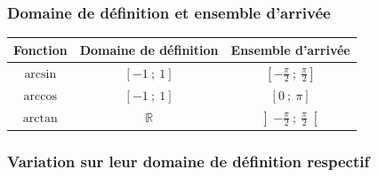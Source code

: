 \documentclass[a4paper]{article}
\begin{document}
			\vspace*{-0.25cm}

			\subsubsection*{Domaine de définition et ensemble d'arrivée}

				\begin{center}
					\setcellgapes{1.5mm}
					\makegapedcells
					\begin{tabular}{|c|c|c|}
						\hline
						\textbf{Fonction} & \textbf{Domaine de définition} & \textbf{Ensemble d'arrivée} \\
						\hline
						$\arcsin$ & $[-1~;~1]$ & $[-\frac{\pi}{2}~;~\frac{\pi}{2}]$ \\
						\hline
						$\arccos$ & $[-1~;~1]$ & $[0~;~\pi]$\\
						\hline
						$\arctan$ & $\mathbb{R}$ & $\left]-\frac{\pi}{2}~;~\frac{\pi}{2}\right[$\\
						\hline
					\end{tabular}
				\end{center}
			
			\vspace*{-0.25cm}

			\subsubsection*{Variation sur leur domaine de définition respectif}

				\begin{center}

					\vspace{0.2cm}
					
				\end{center}
			
			\vspace*{-0.75cm}
\end{document}
